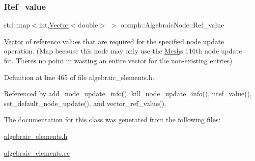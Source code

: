 \mbox{\label{classoomph_1_1AlgebraicNode_a64362fcb07761e9d523c5c6de01612e0}} 
\subsubsection{\texorpdfstring{Ref\+\_\+value}{Ref\_value}}
{\footnotesize\ttfamily std\+::map$<$int,\hyperlink{classoomph_1_1Vector}{Vector}$<$double$>$ $>$ oomph\+::\+Algebraic\+Node\+::\+Ref\+\_\+value\hspace{0.3cm}{\ttfamily [private]}}



\hyperlink{classoomph_1_1Vector}{Vector} of reference values that are required for the specified node update operation. (Map because this node may only use the \hyperlink{classoomph_1_1Mesh}{Mesh}\textquotesingle{}s 116th node update fct. There\textquotesingle{}s no point in wasting an entire vector for the non-\/existing entries) 



Definition at line 465 of file algebraic\+\_\+elements.\+h.



Referenced by add\+\_\+node\+\_\+update\+\_\+info(), kill\+\_\+node\+\_\+update\+\_\+info(), nref\+\_\+value(), set\+\_\+default\+\_\+node\+\_\+update(), and vector\+\_\+ref\+\_\+value().



The documentation for this class was generated from the following files\+:\begin{DoxyCompactItemize}
\item 
\hyperlink{algebraic__elements_8h}{algebraic\+\_\+elements.\+h}\item 
\hyperlink{algebraic__elements_8cc}{algebraic\+\_\+elements.\+cc}\end{DoxyCompactItemize}
